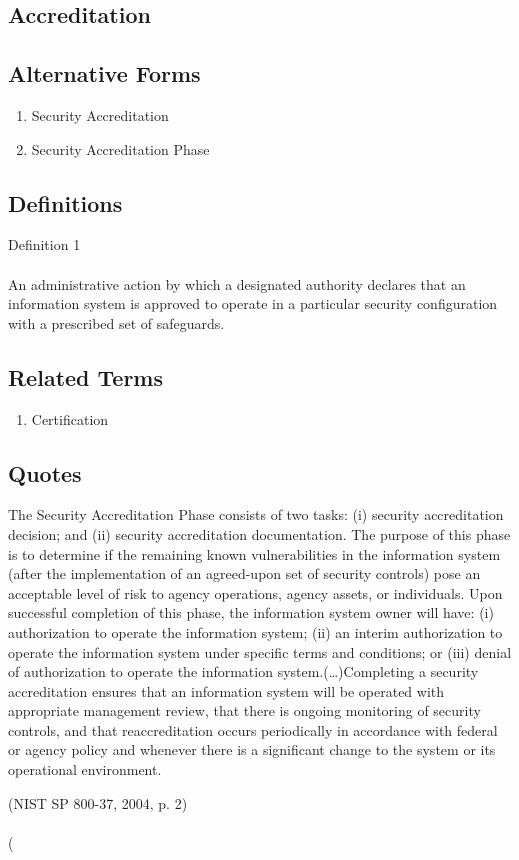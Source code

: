 \newpage \subsection*{Accreditation } \subsection*{Alternative Forms } \begin{enumerate} \item  Security Accreditation  \item  Security Accreditation Phase  \end{enumerate} \subsection*{Definitions } \begin{DIC_Def}{Definition 1 }{} \paragraph{} An administrative action by which a designated authority declares that an information system is approved to operate in a particular security configuration with a prescribed set of safeguards.  \end{DIC_Def} \subsection*{Related Terms } \begin{enumerate} \item  Certification  \end{enumerate} \subsection*{Quotes } \begin{DIC_BlockQuote} The Security Accreditation Phase consists of two tasks: (i) security accreditation decision; and (ii) security accreditation documentation. The purpose of this phase is to determine if the remaining known vulnerabilities in the information system (after the implementation of an agreed-upon set of security controls) pose an acceptable level of risk to agency operations, agency assets, or individuals. Upon successful completion of this phase, the information system owner will have: (i) authorization to operate the information system; (ii) an interim authorization to operate the information system under specific terms and conditions; or (iii) denial of authorization to operate the information system.(\ldots)Completing a security accreditation ensures that an information system will be operated with appropriate management review, that there is ongoing monitoring of security controls, and that reaccreditation occurs periodically in accordance with federal or agency policy and whenever there is a significant change to the system or its operational environment.  \end{DIC_BlockQuote} (NIST SP 800-37, 2004, p. 2)  \paragraph{} (  